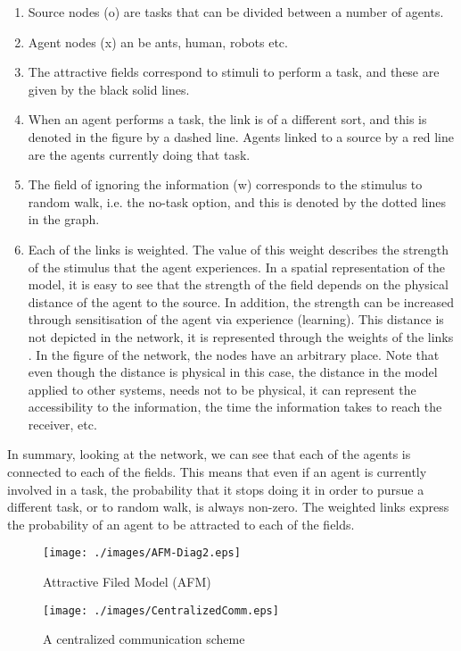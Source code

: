 \begin{enumerate}
\item Source nodes (o) are tasks that can be divided between a number of agents.
\item Agent nodes (x) an be ants, human,  robots etc.
\item The attractive fields correspond to stimuli to perform a task, and these are given by the black solid lines.
\item When an agent performs a task, the link is of a different sort, and this is denoted in the figure by a dashed line. Agents linked to a source by a red line are the agents currently doing that task. 
\item The field of ignoring the information (w) corresponds to the stimulus to random walk, i.e. the no-task option, and this is denoted by the dotted lines in the graph. 
\item Each of the links is weighted. The value of this weight describes the strength of the stimulus that the agent experiences. In a spatial representation of the model, it is easy to see that the strength of the field depends on the physical distance of the agent to the source. In addition, the strength can be increased through sensitisation of the agent via experience (learning). This distance is not depicted in the network, it is represented through the weights of the links . In the figure of the network, the nodes have an arbitrary place. Note that even though the distance is physical in this case, the distance in the model applied to other systems, needs not to be physical, it can represent the accessibility to the information, the time the information takes to reach the receiver, etc. 
\end{enumerate}
In summary, looking at the network, we can see that each of the agents is connected to each of the fields. This means that even if an agent is currently involved in a task, the probability that it stops doing it in order to pursue a different task, or to random walk, is always non-zero. The weighted links express the probability of an agent to be attracted to each of the fields.
\begin{figure}
\begin{minipage}[t]{0.48\linewidth}
\centering
\texttt{[image: ./images/AFM-Diag2.eps]}
\caption{\small Attractive Filed Model (AFM)}
\label{fig:afm} %
\end{minipage}
\hspace{0.5cm}
\begin{minipage}[t]{0.48\linewidth}
\centering
\texttt{[image: ./images/CentralizedComm.eps]}
\caption{\small A centralized communication scheme} %
\label{fig:ccm} %
\end{minipage}
\end{figure}
